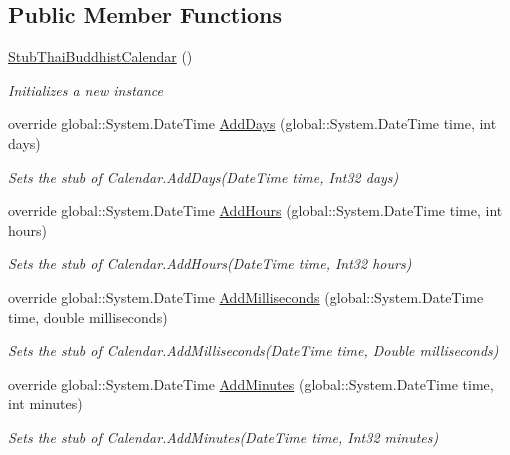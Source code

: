 \subsection*{Public Member Functions}
\begin{DoxyCompactItemize}
\item 
\hyperlink{class_system_1_1_globalization_1_1_fakes_1_1_stub_thai_buddhist_calendar_ac6ea908110414f4c001116ea9082609b}{Stub\-Thai\-Buddhist\-Calendar} ()
\begin{DoxyCompactList}\small\item\em Initializes a new instance\end{DoxyCompactList}\item 
override global\-::\-System.\-Date\-Time \hyperlink{class_system_1_1_globalization_1_1_fakes_1_1_stub_thai_buddhist_calendar_a81b5ef7c959bd06b572473f69bf107f7}{Add\-Days} (global\-::\-System.\-Date\-Time time, int days)
\begin{DoxyCompactList}\small\item\em Sets the stub of Calendar.\-Add\-Days(\-Date\-Time time, Int32 days)\end{DoxyCompactList}\item 
override global\-::\-System.\-Date\-Time \hyperlink{class_system_1_1_globalization_1_1_fakes_1_1_stub_thai_buddhist_calendar_a618d510d941cd8b29c1b620d418a8872}{Add\-Hours} (global\-::\-System.\-Date\-Time time, int hours)
\begin{DoxyCompactList}\small\item\em Sets the stub of Calendar.\-Add\-Hours(\-Date\-Time time, Int32 hours)\end{DoxyCompactList}\item 
override global\-::\-System.\-Date\-Time \hyperlink{class_system_1_1_globalization_1_1_fakes_1_1_stub_thai_buddhist_calendar_a6251f06e84f7c85a1f47bc4b85fab61a}{Add\-Milliseconds} (global\-::\-System.\-Date\-Time time, double milliseconds)
\begin{DoxyCompactList}\small\item\em Sets the stub of Calendar.\-Add\-Milliseconds(\-Date\-Time time, Double milliseconds)\end{DoxyCompactList}\item 
override global\-::\-System.\-Date\-Time \hyperlink{class_system_1_1_globalization_1_1_fakes_1_1_stub_thai_buddhist_calendar_a210cd69ee60da0193f9ee0c849497654}{Add\-Minutes} (global\-::\-System.\-Date\-Time time, int minutes)
\begin{DoxyCompactList}\small\item\em Sets the stub of Calendar.\-Add\-Minutes(\-Date\-Time time, Int32 minutes)\end{DoxyCompactList}\item 

\end{DoxyCompactItemize}

